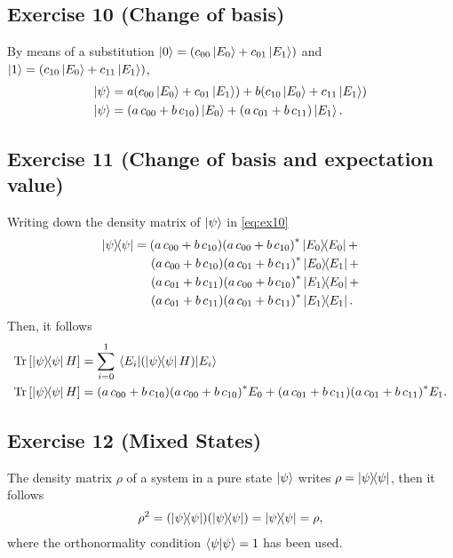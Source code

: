 \subsection{Exercise 10 (Change of basis)}\noindent
By means of a substitution $\ket{0}=\qty(c_{00}\ket{E_0}+c_{01}\ket{E_1})$
and $\ket{1}=\qty(c_{10}\ket{E_0}+c_{11}\ket{E_1})$,
\begin{subequations}
\begin{align}
\ket{\psi}&=a\qty(c_{00}\ket{E_0}+c_{01}\ket{E_1})+
	b\qty(c_{10}\ket{E_0}+c_{11}\ket{E_1})\\
\ket{\psi}&=\qty(a\,c_{00}+b\,c_{10})\ket{E_0}+
	\qty(a\,c_{01}+b\,c_{11})\ket{E_1}.\label{eq:ex10}
\end{align}
\end{subequations}

\subsection{Exercise 11 (Change of basis and expectation value)}\noindent
Writing down the density matrix of $\ket{\psi}$ in \eqref{eq:ex10}
\begin{align}
\dyad{\psi}{\psi}&=\qty(a\,c_{00}+b\,c_{10})\qty(a\,c_{00}+b\,c_{10})^*\dyad{E_0}{E_0}+\nonumber\\
	&\hspace{5mm}\qty(a\,c_{00}+b\,c_{10})\qty(a\,c_{01}+b\,c_{11})^*\dyad{E_0}{E_1}+\nonumber\\ 
		&\hspace{5mm}\qty(a\,c_{01}+b\,c_{11})\qty(a\,c_{00}+b\,c_{10})^*\dyad{E_1}{E_0}+\nonumber\\
			&\hspace{5mm}\qty(a\,c_{01}+b\,c_{11})\qty(a\,c_{01}+b\,c_{11})^*\dyad{E_1}{E_1}.
\end{align}
Then, it follows 
\begin{subequations}
\begin{align}
\Tr\qty[\dyad{\psi}{\psi}H]&=
	\sum_{i=0}^1\matrixel{E_i}{\qty(\dyad{\psi}{\psi}H)}{E_i}\\
\Tr\qty[\dyad{\psi}{\psi}H]&=\qty(a\,c_{00}+b\,c_{10})\qty(a\,c_{00}+b\,c_{10})^*E_0+
		\qty(a\,c_{01}+b\,c_{11})\qty(a\,c_{01}+b\,c_{11})^*E_1.
\end{align}
\end{subequations}

\subsection{Exercise 12 (Mixed States)}\noindent
The density matrix $\rho$ of a system in a pure state $\ket{\psi}$ writes
$\rho=\dyad{\psi}{\psi}$, then it follows
\begin{align}
\rho^2=\qty(\dyad{\psi}{\psi})\qty(\dyad{\psi}{\psi})=\dyad{\psi}{\psi}=\rho,
\end{align}
where the orthonormality condition $\braket{\psi}{\psi}=1$ has been used.


